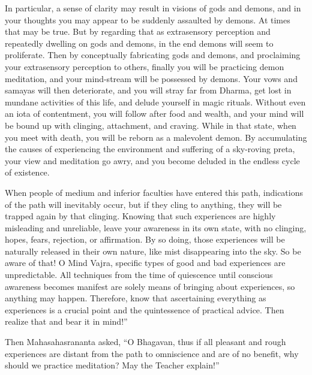 \documentclass[a4paper,11pt,twoside,final]{book}
\begin{document}
In particular, a sense of clarity may result in visions of gods and
demons, and in your thoughts you may appear to be suddenly assaulted
by demons. At times that may be true. But by regarding that as
extrasensory perception and repeatedly dwelling on gods and demons, in
the end demons will seem to proliferate. Then by conceptually
fabricating gods and demons, and proclaiming your extrasensory
perception to others, finally you will be practicing demon meditation,
and your mind-stream will be possessed by demons. Your vows and
samayas will then deteriorate, and you will stray far from Dharma, get
lost in mundane activities of this life, and delude yourself in magic
rituals. Without even an iota of contentment, you will follow after
food and wealth, and your mind will be bound up with clinging,
attachment, and craving. While in that state, when you meet with
death, you will be reborn as a malevolent demon. By accumulating the
causes of experiencing the environment and suffering of a sky-roving
preta, your view and meditation go awry, and you become deluded in the
endless cycle of existence.

When people of medium and inferior faculties have entered this path,
indications of the path will inevitably occur, but if they cling to
anything, they will be trapped again by that clinging. Knowing that
such experiences are highly misleading and unreliable, leave your
awareness in its own state, with no clinging, hopes, fears, rejection,
or affirmation. By so doing, those experiences will be naturally
released in their own nature, like mist disappearing into the sky. So
be aware of that!  O Mind Vajra, specific types of good and bad
experiences are unpredictable. All techniques from the time of
quiescence until conscious awareness becomes manifest are solely means
of bringing about experiences, so anything may happen. Therefore, know
that ascertaining everything as experiences is a crucial point and the
quintessence of practical advice. Then realize that and bear it in
mind!''

Then Mahasahasrananta asked, ``O Bhagavan, thus if all pleasant and
rough experiences are distant from the path to omniscience and are of
no benefit, why should we practice meditation? May the Teacher
explain!''
\end{document}
